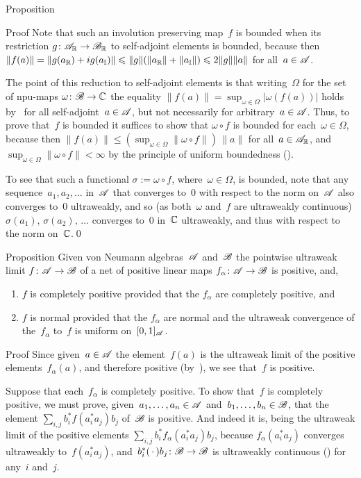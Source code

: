 \documentclass[a]{subfiles}
\begin{document}
\begin{parsec}
\begin{point}{Proposition}
\begin{point}{Proof}
Note that such an involution preserving map~$f$
is bounded
when its restriction $g\colon \mathscr{A}_{\mathbb{R}}\to\mathscr{B}_{\mathbb{R}}$
to self-adjoint elements
is bounded,
because then $\|f(a)\|=\|g(a_{\mathbb{R}})+ig(a_{\mathbb{I}})\|\leqslant
\|g\| (\|a_{\mathbb{R}}\|+\|a_{\mathbb{I}}\|)
\leqslant 2\|g\| \|a\|$ for all~$a\in\mathscr{A}$.

The point of this reduction
to self-adjoint elements
is that writing~$\Omega$ for the 
set of npu-maps $\omega\colon \mathscr{B}\to\mathbb{C}$
the equality
$\|f(a)\|=\sup_{\omega\in\Omega} \left|\omega(f(a))\right|$
holds by~ for all self-adjoint~$a\in\mathscr{A}$,
but not necessarily for arbitrary~$a\in\mathscr{A}$.
Thus, to prove that~$f$
is bounded it suffices to show that $\omega\circ f$
is bounded for each~$\omega\in\Omega$,
because then $\|f(a)\|\leq (\sup_{\omega\in\Omega}\|\omega\circ f\|)\,\|a\|$
for all~$a\in \mathscr{A}_{\mathbb{R}}$,
and~$\sup_{\omega\in \Omega} \|\omega\circ f\|<\infty$
by the principle of uniform boundedness ().

To see that such a functional $\sigma:=\omega\circ f$,
where~$\omega\in\Omega$,
is bounded,
note that any sequence~$a_1,a_2,\dotsc$
in~$\mathscr{A}$ that converges to~$0$
with respect to the norm on~$\mathscr{A}$
also converges to~$0$ ultraweakly,
and so
(as both~$\omega$ and~$f$ are ultraweakly continuous)
$\sigma(a_1),\,\sigma(a_2),\,\dotsc$
converges to~$0$ in~$\mathbb{C}$ ultraweakly,
and thus with respect to the norm on~$\mathbb{C}$.\qed
\end{point}
\end{point}
\begin{point}{Proposition}%
Given von Neumann algebras~$\mathscr{A}$
and~$\mathscr{B}$
the pointwise ultraweak limit
$f\colon \mathscr{A}\to\mathscr{B}$
of a net of  positive linear maps $f_\alpha\colon \mathscr{A}\to\mathscr{B}$
is positive, and, 
\begin{enumerate}
\item
$f$ is completely positive provided
that the $f_\alpha$ are completely positive, and
\item
$f$ is normal provided that the $f_\alpha$ are normal
and the ultraweak convergence of the~$f_\alpha$ to~$f$
is uniform on~$[0,1]_{\mathscr{A}}$.
\end{enumerate}
\begin{point}{Proof}%
Since given~$a\in \mathscr{A}$ the element~$f(a)$
is the ultraweak limit of the positive elements~$f_\alpha(a)$,
and therefore positive (by~),
we see that~$f$ is positive.

Suppose that each~$f_\alpha$ is completely positive.
To show that~$f$ is completely positive,
we must prove, given~$a_1,\dotsc,a_n\in\mathscr{A}$
and~$b_1,\dotsc,b_n\in\mathscr{B}$,
that 
the element $\sum_{i,j} b_i^* f(a_i^*a_j)b_j$
of~$\mathscr{B}$
is positive.
And indeed it is,
being the ultraweak limit of
the positive elements $\sum_{i,j} b_i^* f_\alpha (a_i^* a_j)b_j$,
because  $f_\alpha(a_i^* a_j)$
converges ultraweakly to~$f(a_i^* a_j)$,
and~$b_i^*(\,\cdot\,)b_j\colon \mathscr{B}\to\mathscr{B}$
is ultraweakly continuous
()
for any~$i$ and~$j$.


\end{point}
\end{point}
\end{parsec}
\end{document}
